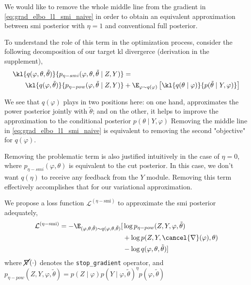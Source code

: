 We would like to remove the whole middle line from the gradient in \cref{eq:grad_elbo_l1_smi_naive} in order to obtain an equivalent approximation between \acrshort*{smi} posterior with $\eta=1$ and conventional full posterior.

To understand the role of this term in the optimization process, consider the following decomposition of our target \acrshort*{kl} divergerce (derivation in the supplement),
\begin{align*}
  \kl{ q(\varphi, \theta, \tilde\theta) }{ p_{\eta-smi}(\varphi, \theta, \tilde\theta \mid Z, Y) } & =                                                                                                             \\
  \kl{ q(\varphi, \tilde\theta) }{ p_{\eta-pow}(\varphi, \tilde\theta \mid Z, Y) }                 & + \E_{\varphi \sim q(\varphi)}\left[ \kl{ q(\theta \mid \varphi) }{ p(\tilde\theta \mid Y, \varphi) } \right]
\end{align*}

We see that $q(\varphi)$ plays in two positions here: on one hand, approximates the power posterior jointly with $\tilde\theta$; and on the other, it helps to improve the approximation to the conditional posterior $p(\theta \mid Y, \varphi)$
Removing the middle line in \cref{eq:grad_elbo_l1_smi_naive} is equivalent to removing the second "objective" for $q(\varphi)$.

Removing the problematic term is also justified intuitively in the case of $\eta=0$, where $p_{\eta-smi}(\varphi,\theta)$ is equivalent to the cut posterior.
In this case, we don't want $q(\eta)$ to receive any feedback from the $Y$ module.
Removing this term effectively accomplishes that for our variational approximation.

We propose a loss function $\mathcal{L}^{(\eta-\text{smi})}$ to approximate the \acrshort*{smi} posterior adequately,
\begin{align} \label{eq:vsmi_loss}
  \mathcal{L}^{(\eta-\text{smi})} = -\E_{(\varphi, \theta, \tilde\theta) \sim q(\varphi, \theta, \tilde\theta)}[ & \log p_{\eta-pow}(Z, Y, \varphi, \tilde\theta) \nonumber   \\
                                                                                                                 & + \log p(Z, Y, \cancel{\nabla}(\varphi), \theta) \nonumber \\
                                                                                                                 & - \log q(\varphi, \theta, \tilde\theta) ]
\end{align}
where $\cancel{\nabla}(\cdot)$ denotes the \texttt{stop\_gradient} operator, and $p_{\eta-pow}(Z, Y, \varphi, \tilde\theta) = p(Z\mid\varphi)p(Y \mid \varphi, \tilde\theta)^{\eta}p(\varphi, \tilde\theta)$


